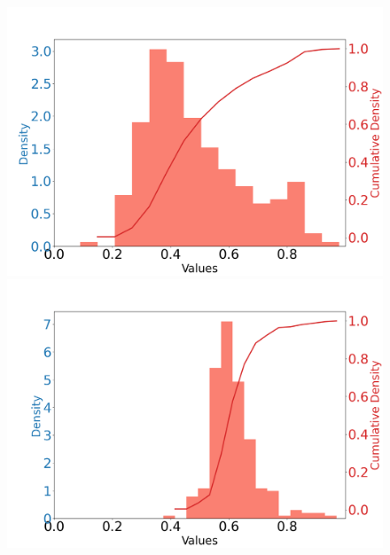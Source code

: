 \documentclass{article}
\begin{document}
\begin{figure}[htbp]
\begin{minipage}{0.195\textwidth}
    \end{minipage}
    \begin{minipage}{0.195\textwidth}
    \centering
    \includegraphics[scale=0.08]{figures/shot_density_idx_21_XCoord:74.75_YCoord:-0.25.png}
    \end{minipage}
    \begin{minipage}{0.195\textwidth}
    \centering
    \includegraphics[scale=0.08]{figures/shot_density_idx_7_XCoord:85.69_YCoord:-21.88.png}
    \end{minipage}
    \begin{minipage}{0.195\textwidth}
    \centering

\end{minipage}
\end{figure}
\end{document}
